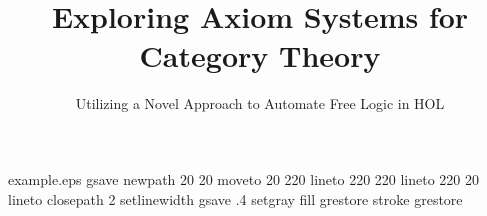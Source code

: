 %
%
%
%
%
\begin{filecontents*}{example.eps}
gsave
newpath
  20 20 moveto
  20 220 lineto
  220 220 lineto
  220 20 lineto
closepath
2 setlinewidth
gsave
  .4 setgray fill
grestore
stroke
grestore
\end{filecontents*}
%
\RequirePackage{fix-cm}
%
\documentclass[smallextended]{svjour3}       %
%
\smartqed  %
%
\usepackage{graphicx,tikz}
%
%
%
%
%


\def\D{\mathbf{D}}
\def\E{\mathbf{E}}

\def\FFOL{\mathit{FFOL}}
\def\V{\mathit{V}}
\def\F{\mathit{F}}
\def\P{\mathit{P}}
\def\True{\mathit{True}}
\def\False{\mathit{False}}





\title{Exploring Axiom Systems for Category Theory%
}
\subtitle{Utilizing a 
 Novel Approach to Automate Free Logic in HOL}


